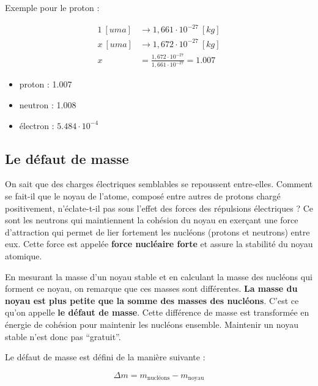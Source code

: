 \documentclass[
  11pt,
  french,
  a4paper,
  openany]{book}
\providecommand{\tightlist}{%
  \setlength{\itemsep}{0pt}\setlength{\parskip}{0pt}}
\begin{document}

\begin{Answer}

Exemple pour le proton :

\[ \begin{split}
  1~[uma] &\rightarrow 1,661\cdot10^{-27}~[kg] \\
  x~[uma] &\rightarrow 1,672\cdot10^{-27}~[kg] \\
  x &= \frac{1,672\cdot10^{-27}}{1,661\cdot10^{-27}} = 1.007
  \end{split} \]

\begin{itemize}
\tightlist
\item
  proton : 1.007
\item
  neutron : 1.008
\item
  électron : \(5.484\cdot10^{-4}\)
\end{itemize}


\end{Answer}

\hypertarget{le-duxe9faut-de-masse}{%
\subsection{Le défaut de masse}\label{le-duxe9faut-de-masse}}

On sait que des charges électriques semblables se repoussent entre-elles. Comment se fait-il que le noyau de l'atome, composé entre autres de protons chargé positivement, n'éclate-t-il pas sous l'effet des forces des répulsions électriques ? Ce sont les neutrons qui maintiennent la cohésion du noyau en exerçant une force d'attraction qui permet de lier fortement les nucléons (protons et neutrons) entre eux. Cette force est appelée \textbf{force nucléaire forte} et assure la stabilité du noyau atomique.

En mesurant la masse d'un noyau stable et en calculant la masse des nucléons qui forment ce noyau, on remarque que ces masses sont différentes. \textbf{La masse du noyau est plus petite que la somme des masses des nucléons}. C'est ce qu'on appelle \textbf{le défaut de masse}. Cette différence de masse est transformée en énergie de cohésion pour maintenir les nucléons ensemble. Maintenir un noyau stable n'est donc pas ``gratuit''.

Le défaut de masse est défini de la manière suivante :

\[
\Delta m = m_{\text{nucléons}} - m_{\text{noyau}}
\]
\end{document}
